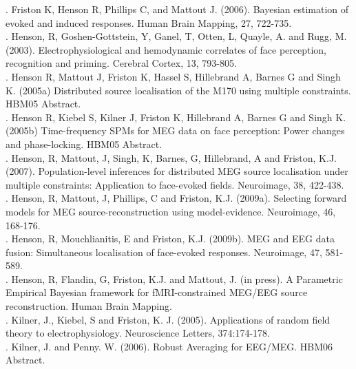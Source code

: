 . Friston K, Henson R, Phillips C, and Mattout J. (2006). Bayesian estimation of evoked and induced responses. Human Brain Mapping, 27, 722-735.\\

. Henson, R, Goshen-Gottstein, Y, Ganel, T, Otten, L, Quayle, A. and Rugg, M. (2003). Electrophysiological and hemodynamic correlates of face perception, recognition and priming. Cerebral Cortex, 13, 793-805.\\

. Henson R, Mattout J, Friston K, Hassel S, Hillebrand A, Barnes G and Singh K. (2005a) Distributed source localisation of the M170 using multiple constraints. HBM05 Abstract.\\

. Henson R, Kiebel S, Kilner J, Friston K, Hillebrand A, Barnes G and Singh K. (2005b) Time-frequency SPMs for MEG data on face perception: Power changes and phase-locking. HBM05 Abstract.\\

. Henson, R, Mattout, J, Singh, K, Barnes, G, Hillebrand, A and Friston, K.J. (2007). Population-level inferences for distributed MEG source localisation under multiple constraints: Application to face-evoked fields. Neuroimage, 38, 422-438.\\

. Henson, R, Mattout, J, Phillips, C and Friston, K.J. (2009a). Selecting forward models for MEG source-reconstruction using model-evidence. Neuroimage, 46, 168-176.\\

. Henson, R, Mouchlianitis, E and Friston, K.J. (2009b). MEG and EEG data fusion: Simultaneous localisation of face-evoked responses. Neuroimage, 47, 581-589.\\

. Henson, R, Flandin, G, Friston, K.J. and Mattout, J. (in press). A Parametric Empirical Bayesian framework for fMRI-constrained MEG/EEG source reconstruction. Human Brain Mapping.\\

. Kilner, J., Kiebel, S and Friston, K. J. (2005). Applications of random field theory to electrophysiology. Neuroscience Letters, 374:174-178.\\

. Kilner, J. and Penny. W. (2006). Robust Averaging for EEG/MEG. HBM06 Abstract.\\

